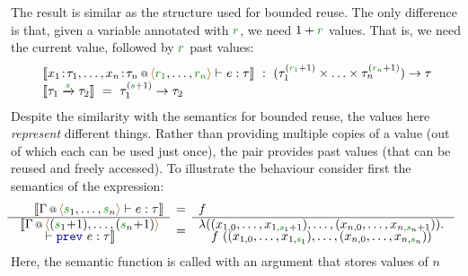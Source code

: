The result is similar as the structure used for bounded reuse. The only difference is that, given
a variable annotated with $\cclrd{r}$, we need $1+\cclrd{r}$ values. That is, we need the current
value, followed by $\cclrd{r}$ past values:
%
\begin{equation*}
\begin{array}{l}
\sem{\coctx{x_1\!:\!\tau_1, \ldots, x_n\!:\!\tau_n}{ \alift{\cclrd{r_1}, \ldots, \cclrd{r_n}} } \vdash e : \tau}
  ~:~ (\tau^{(\cclrd{r_1}+1)}_1 \times \ldots \times \tau^{(\cclrd{r_n}+1)}_n) \rightarrow \tau\\
\sem{\tau_1 \xrightarrow{\cclrd{s}} \tau_2} ~=~ \tau_1^{(\cclrd{s}+1)} \rightarrow \tau_2
\end{array}
\end{equation*}
%
Despite the similarity with the semantics for bounded reuse, the values here \emph{represent}
different things. Rather than providing multiple copies of a value (out of which each can be
used just once), the pair provides past values (that can be reused and freely accessed).
To illustrate the behaviour consider first the semantics of the  expression:
%
\begin{equation*}
\hspace{-1em}
\begin{array}{l}
\emdeff
  {\coctx{\Gamma}{\alift{\cclrd{s}_1, \ldots, \cclrd{s}_n}} \vdash e : \tau}
  {\begin{array}{l}\sem{\coctx{\Gamma}{\alift{(\cclrd{s}_1 \hspace{-0.2em}+\hspace{-0.2em} 1), \ldots, (\cclrd{s}_n \hspace{-0.2em}+\hspace{-0.2em} 1)}}\\[-0.25em]
    \qquad\vdash \kvd{prev}~e : \tau}\end{array}\hspace{-0.5em}~}
  {f}
  {\hspace{-0.5em}\begin{array}{l}\lambda((x_{1,0}, \ldots, x_{1,{\cclrd{s}_1 + 1}}), \ldots, (x_{n,0}, \ldots, x_{n,{\cclrd{s}_n + 1}})).\\[-0.25em]
  \quad f~((x_{1,0}, \ldots, x_{1,\cclrd{s}_1}), \ldots, (x_{n,0}, \ldots, x_{n,\cclrd{s}_n}))\end{array}\hspace{-0.5em}~}
\end{array}
\end{equation*}
%
Here, the semantic function is called with an argument that stores values of $n$
